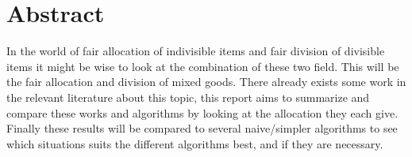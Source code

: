 \chapter{Abstract}\label{chp:abstract}

In the world of fair allocation of indivisible items and fair division of divisible items it might be wise to look at the combination of these two field. This will be the fair allocation and division of mixed goods. There already exists some work in the relevant literature about this topic, this report aims to summarize and compare these works and algorithms by looking at the allocation they each give. Finally these results will be compared to several naive/simpler algorithms to see which situations suits the different algorithms best, and if they are necessary.